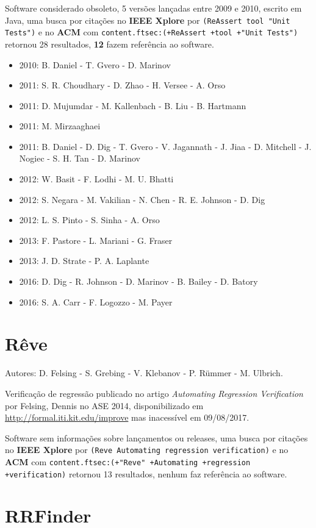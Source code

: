 Software considerado obsoleto,
5 versões lançadas
entre 2009 e 2010,
escrito em Java,
uma busca por citações no {\bf IEEE Xplore} por
\texttt{(ReAssert tool "Unit Tests")}
e no {\bf ACM} com
\texttt{content.ftsec:(+ReAssert +tool +"Unit Tests")}
retornou
28 resultados,
{\bf 12} fazem referência ao software.

\begin{itemize}
\item 2010: B. Daniel - T. Gvero - D. Marinov
\item 2011: S. R. Choudhary - D. Zhao - H. Versee - A. Orso
\item 2011: D. Mujumdar - M. Kallenbach - B. Liu - B. Hartmann
\item 2011: M. Mirzaaghaei
\item 2011: B. Daniel - D. Dig - T. Gvero - V. Jagannath - J. Jiaa - D. Mitchell - J. Nogiec - S. H. Tan - D. Marinov
\item 2012: W. Basit - F. Lodhi - M. U. Bhatti
\item 2012: S. Negara - M. Vakilian - N. Chen - R. E. Johnson - D. Dig
\item 2012: L. S. Pinto - S. Sinha - A. Orso
\item 2013: F. Pastore - L. Mariani - G. Fraser
\item 2013: J. D. Strate - P. A. Laplante
\item 2016: D. Dig - R. Johnson - D. Marinov - B. Bailey - D. Batory
\item 2016: S. A. Carr - F. Logozzo - M. Payer
\end{itemize}

\section{Rêve}

Autores:
D. Felsing - S. Grebing - V. Klebanov - P. R\"{u}mmer - M. Ulbrich.

Verificação de regressão
publicado no artigo {\it Automating Regression Verification}
por Felsing, Dennis
no ASE 2014,
disponibilizado em \url{http://formal.iti.kit.edu/improve}
mas inacessível em 09/08/2017.

Software sem informações sobre lançamentos ou releases,
uma busca por citações no {\bf IEEE Xplore} por
\texttt{(Reve Automating regression verification)}
e no {\bf ACM} com
\texttt{content.ftsec:(+"Reve" +Automating +regression +verification)}
retornou
13 resultados,
nenhum faz referência ao software.


\section{RRFinder}

